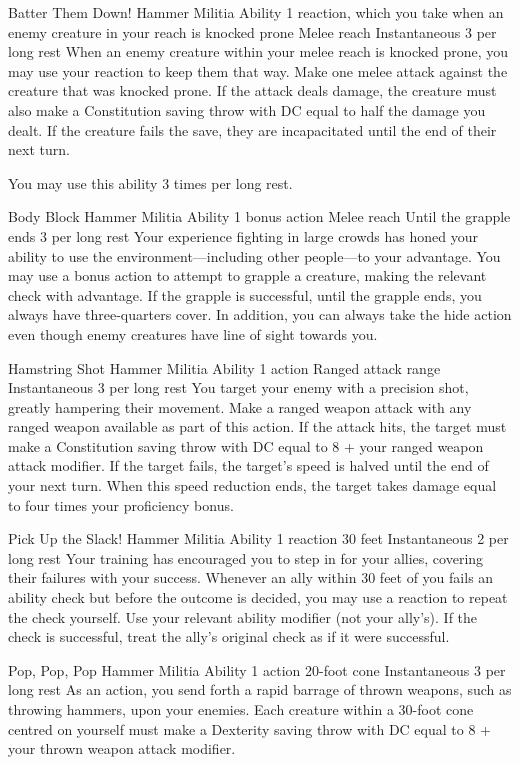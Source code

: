 \ability%
    {Batter Them Down!}
    {Hammer Militia Ability}
    {1 reaction, which you take when an enemy creature in your reach is knocked prone}
    {Melee reach}
    {Instantaneous}
    {3 per long rest}
When an enemy creature within your melee reach is knocked prone,
you may use your reaction to keep them that way. 
Make one melee attack against the creature
that was knocked prone.
If the attack deals damage,
the creature must also make a Constitution saving throw
with DC equal to half the damage you dealt.
If the creature fails the save,
they are incapacitated until the end of their next turn.

You may use this ability 3 times per long rest.


\ability%
    {Body Block}
    {Hammer Militia Ability}
    {1 bonus action}
    {Melee reach}
    {Until the grapple ends}
    {3 per long rest}
Your experience fighting in large crowds
has honed your ability to use the environment---including
other people---to your advantage.
You may use a bonus action to attempt to grapple a creature,
making the relevant check with advantage.
If the grapple is successful,
until the grapple ends,
you always have three-quarters cover.
In addition,
you can always take the hide action even though enemy creatures
have line of sight towards you.


\ability%
    {Hamstring Shot}
    {Hammer Militia Ability}
    {1 action}
    {Ranged attack range}
    {Instantaneous}
    {3 per long rest}
You target your enemy with a precision shot,
greatly hampering their movement.
Make a ranged weapon attack with any ranged weapon available
as part of this action.
If the attack hits,
the target must make a Constitution saving throw
with DC equal to 8 + your ranged weapon attack modifier.
If the target fails,
the target's speed is halved until the end of your next turn.
When this speed reduction ends,
the target takes damage equal to four times your proficiency bonus.

\ability%
    {Pick Up the Slack!}
    {Hammer Militia Ability}
    {1 reaction}
    {30 feet}
    {Instantaneous}
    {2 per long rest}
Your training has encouraged you to step in for your allies,
covering their failures with your success.
Whenever an ally within 30 feet of you fails an ability check
but before the outcome is decided,
you may use a reaction to repeat the check yourself.
Use your relevant ability modifier (not your ally's).
If the check is successful,
treat the ally's original check as if it were successful.


\ability%
    {Pop, Pop, Pop}
    {Hammer Militia Ability}
    {1 action}
    {20-foot cone}
    {Instantaneous}
    {3 per long rest}
As an action,
you send forth a rapid barrage of thrown weapons,
such as throwing hammers, upon your enemies.
Each creature within a 30-foot cone centred on yourself
must make a Dexterity saving throw with DC equal to
8 + your thrown weapon attack modifier.

